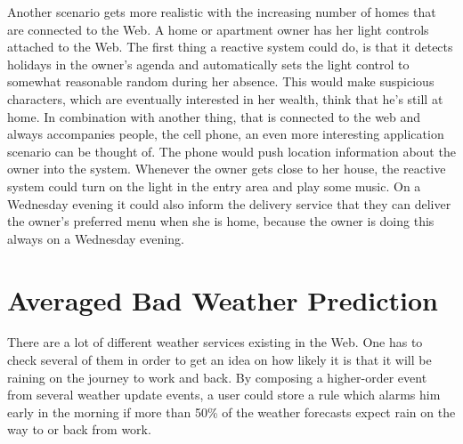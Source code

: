 Another scenario gets more realistic with the increasing number of homes that are connected to the Web.
A home or apartment owner has her light controls attached to the Web.
The first thing a reactive system could do, is that it detects holidays in the owner's agenda and automatically sets the light control to somewhat reasonable random during her absence.
This would make suspicious characters, which are eventually interested in her wealth, think that he's still at home.
In combination with another thing, that is connected to the \textrm{\gls{web}} and always accompanies people, the cell phone, an even more interesting application scenario can be thought of.
The phone would push location information about the owner into the system.
Whenever the owner gets close to her house, the reactive system could turn on the light in the entry area and play some music.
On a Wednesday evening it could also inform the delivery service that they can deliver the owner's preferred menu when she is home, because the owner is doing this always on a Wednesday evening.



\section{Averaged Bad Weather Prediction}
There are a lot of different weather services existing in the Web.
One has to check several of them in order to get an idea on how likely it is that it will be raining on the journey to work and back.
By composing a higher-order event from several weather update events, a user could store a rule which alarms him early in the morning if more than 50\% of the weather forecasts expect rain on the way to or back from work.
